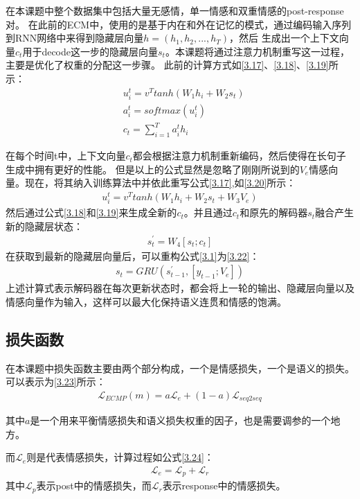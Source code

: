 \documentclass[supercite]{HustGraduPaper}
\theoremstyle{definition}
\begin{document}
在本课题中整个数据集中包括大量无感情，单一情感和双重情感的post-response对。
在此前的ECM中，使用的是基于内在和外在记忆的模式，通过编码输入序列到RNN网络中来得到隐藏层向量$h = (h_1,h_2,...,h_T)$，然后
生成出一个上下文向量$c_t$用于decode这一步的隐藏层向量$s_t$。本课题将通过注意力机制重写这一过程，主要是优化了权重的分配这一步骤。
此前的计算方式如\ref{3.17}、\ref{3.18}、\ref{3.19}所示：
\begin{align}
  &u_i^t = v^T tanh(W_1h_i + W_2 s_t) \label{3.17}\\
  &a_i^t = softmax(u_i^t) \label{3.18}\\
  &c_t = \sum_{i=1}^T a_i^t h_i \label{3.19}
\end{align}

在每个时间t中，上下文向量$c_t$都会根据注意力机制重新编码，然后使得在长句子生成中拥有更好的性能。
但是以上的公式显然是忽略了刚刚所说到的$V_e$情感向量。现在，将其纳入训练算法中并依此重写公式\ref{3.17},如\ref{3.20}所示：
\begin{align}
  u_i^t = v^T tanh(W_1h_i + W_2 s_t + W_3V_e) \label{3.20}
\end{align}
然后通过公式\ref{3.18}和\ref{3.19}来生成全新的$c_t$。并且通过$c_t$和原先的解码器$s_t$融合产生新的隐藏层状态：
\begin{align}
  s^{'}_t = W_4[s_t;c_t] \label{3.21}
\end{align}
在获取到最新的隐藏层向量后，可以重构公式\ref{3.1}为\ref{3.22}：
\begin{align}
  s_t = GRU(s^{'}_{t-1},[y_{t-1};V_e]) \label{3.22}
\end{align}
上述计算式表示解码器在每次更新状态时，都会将上一轮的输出、隐藏层向量以及情感向量作为输入，这样可以最大化保持语义连贯和情感的饱满。

\subsection{损失函数}
在本课题中损失函数主要由两个部分构成，一个是情感损失，一个是语义的损失。可以表示为\ref{3.23}所示：
\begin{align}
  \mathcal{L}_{ECMP} (m) = a \mathcal{L}_e + (1-a)\mathcal{L}_{seq2seq} \label{3.23}
\end{align}

其中$a$是一个用来平衡情感损失和语义损失权重的因子，也是需要调参的一个地方。

而$\mathcal{L}_e$则是代表情感损失，计算过程如公式\ref{3.24}：
\begin{align}
  \mathcal{L}_e = \mathcal{L}_p + \mathcal{L}_r \label{3.24}
\end{align}
其中$\mathcal{L}_p$表示post中的情感损失，而$\mathcal{L}_r$表示response中的情感损失。
\end{document}
